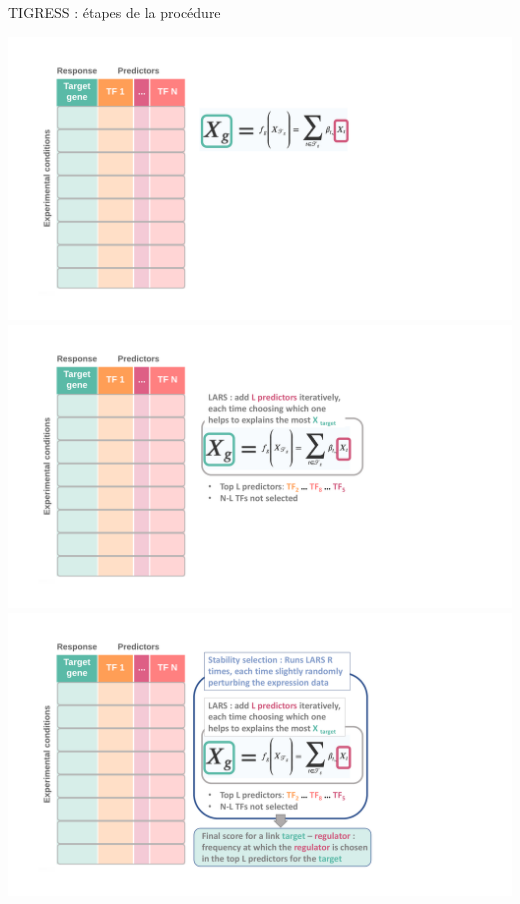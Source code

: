 

	
\begin{frame}{TIGRESS : étapes de la procédure}
	\vspace{-0.3cm}
	\begin{overprint}
	  \includegraphics[scale=0.35]{Figures/Regression/tigress_1-1.pdf}
	 \onslide<2> \includegraphics[scale=0.35]{Figures/Regression/tigress_2-2.pdf}
	 \onslide<3> \includegraphics[scale=0.35]{Figures/Regression/tigress_3-3.pdf}

\end{overprint}
\end{frame}
